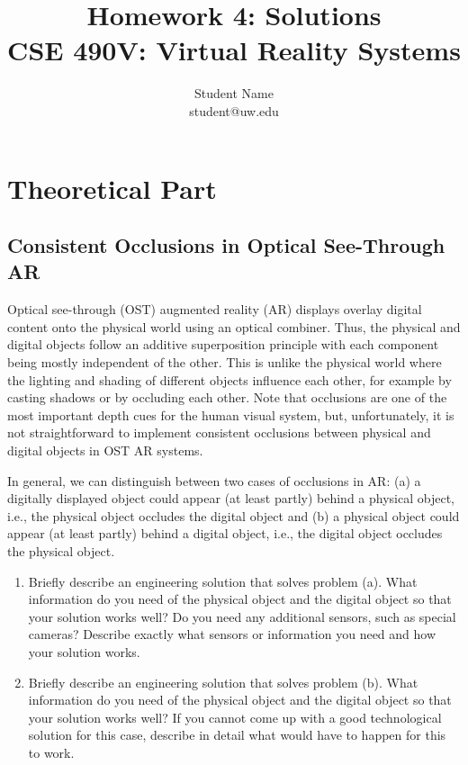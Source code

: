 \documentclass[conference]{styles/acmsiggraph}
\title{\huge Homework 4: Solutions \\ \LARGE {CSE 490V: Virtual Reality Systems}}
\author{\Large Student Name \\ student@uw.edu}
\newcommand{\points}[1]{\hfill \normalfont{(\textit{#1pts})}}
\newcommand{\pointsin}[1]{\normalfont{(\textit{#1pts})}}
\begin{document}
\maketitle

\section{Theoretical Part}
\subsection{Consistent Occlusions in Optical See-Through AR \points{10}}

Optical see-through (OST) augmented reality (AR) displays overlay digital content onto the physical world using an optical combiner. Thus, the physical and digital objects follow an additive superposition principle with each component being mostly independent of the other. This is unlike the physical world where the lighting and shading of different objects influence each other, for example by casting shadows or by occluding each other. Note that occlusions are one of the most important depth cues for the human visual system, but, unfortunately, it is not straightforward to implement consistent occlusions between physical and digital objects in OST AR systems. 

In general, we can distinguish between two cases of occlusions in AR: (a) a digitally displayed object could appear (at least partly) behind a physical object, i.e., the physical object occludes the digital object and (b) a physical object could appear (at least partly) behind a digital object, i.e., the digital object occludes the physical object.

\begin{enumerate}[label=(\roman*)]
\item Briefly describe an engineering solution that solves problem (a). What information do you need of the physical object and the digital object so that your solution works well? Do you need any additional sensors, such as special cameras? Describe exactly what sensors or information you need and how your solution works. \pointsin{5}
\item Briefly describe an engineering solution that solves problem (b). What information do you need of the physical object and the digital object so that your solution works well? If you cannot come up with a good technological solution for this case, describe in detail what would have to happen for this to work. \pointsin{5}
\end{enumerate}
\end{document}

